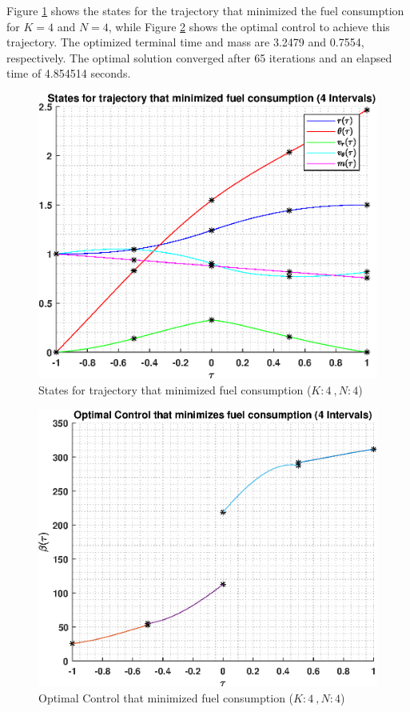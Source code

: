 \documentclass[]{article}
\begin{document}
\vspace{2mm}\newline 
Figure \ref{fig:directStatesK4Poly4} shows the states for the trajectory that minimized the fuel consumption for \(K = 4\) and  \(N = 4\), while Figure \ref{fig:directControlK4Poly4} shows the optimal control to achieve this trajectory. The optimized terminal time and mass are 3.2479 and 0.7554, respectively. The optimal solution converged after 65 iterations and an elapsed time of 4.854514 seconds.
\begin{figure}
	\centering
	\includegraphics[scale=0.75]{directStatesK4Poly4.eps}
	\caption{States for trajectory that minimized fuel consumption (\(K:4\ , N:4\))}
	\label{fig:directStatesK4Poly4}
\end{figure}
\begin{figure}
	\centering
	\includegraphics[scale=0.75]{directControlK4Poly4.eps}
	\caption{Optimal Control that minimized fuel consumption (\(K:4\ , N:4\))}
	\label{fig:directControlK4Poly4}
\end{figure}
\end{document}
